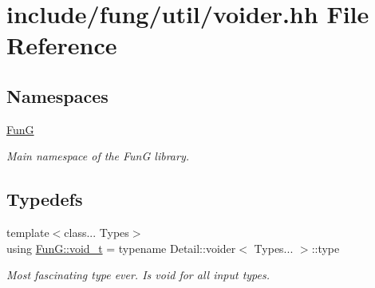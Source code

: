 \hypertarget{voider_8hh}{}\section{include/fung/util/voider.hh File Reference}
\label{voider_8hh}
\subsection*{Namespaces}
\begin{DoxyCompactItemize}
\item 
 \hyperlink{namespaceFunG}{FunG}
\begin{DoxyCompactList}\small\item\em Main namespace of the FunG library. \end{DoxyCompactList}\end{DoxyCompactItemize}
\subsection*{Typedefs}
\begin{DoxyCompactItemize}
\item 
{\footnotesize template$<$class... Types$>$ }\\using \hyperlink{namespaceFunG_a0cde667596590eb8d32e4a5ee76ddbb9}{Fun\+G\+::void\+\_\+t} = typename Detail\+::voider$<$ Types... $>$\+::type
\begin{DoxyCompactList}\small\item\em Most fascinating type ever. Is void for all input types. \end{DoxyCompactList}\end{DoxyCompactItemize}
